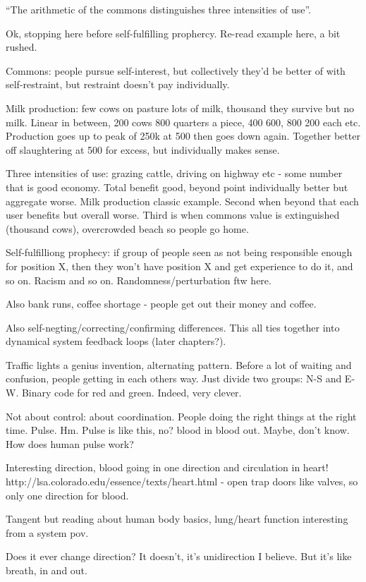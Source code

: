\documentclass[12pt]{report}
\begin{document}
``The arithmetic of the commons distinguishes three intensities of use''.

Ok, stopping here before self-fulfilling prophercy. Re-read example here, a bit rushed.

Commons: people pursue self-interest, but collectively they'd be better of with
self-restraint, but restraint doesn't pay individually.

Milk production: few cows on pasture lots of milk, thousand they survive but no
milk. Linear in between, 200 cows 800 quarters a piece, 400 600, 800 200 each
etc. Production goes up to peak of 250k at 500 then goes down again. Together
better off slaughtering at 500 for excess, but individually makes sense.

Three intensities of use: grazing cattle, driving on highway etc - some number
that is good economy. Total benefit good, beyond point individually better but
aggregate worse. Milk production classic example. Second when beyond that each
user benefits but overall worse. Third is when commons value is extinguished
(thousand cows), overcrowded beach so people go home.

Self-fulfilliong prophecy: if group of people seen as not being responsible
enough for position X, then they won't have position X and get experience to do
it, and so on. Racism and so on. Randomness/perturbation ftw here.

Also bank runs, coffee shortage - people get out their money and coffee.

Also self-negting/correcting/confirming differences. This all ties together into
dynamical system feedback loops (later chapters?).

Traffic lights a genius invention, alternating pattern. Before a lot of waiting
and confusion, people getting in each others way. Just divide two groups: N-S
and E-W. Binary code for red and green. Indeed, very clever.

Not about control: about coordination. People doing the right things at the
right time. Pulse. Hm. Pulse is like this, no? blood in blood out. Maybe, don't
know. How does human pulse work?

Interesting direction, blood going in one direction and circulation in heart!
http://lsa.colorado.edu/essence/texts/heart.html - open trap doors like valves,
so only one direction for blood.

Tangent but reading about human body basics, lung/heart function interesting
from a system pov.

Does it ever change direction? It doesn't, it's unidirection I believe. But it's
like breath, in and out.
\end{document}
